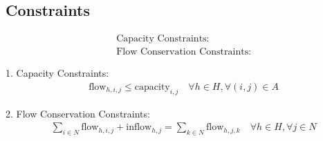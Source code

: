 \documentclass{article}
\begin{document}
	\subsection*{Constraints}
	\begin{align*}
		& \text{Capacity Constraints:} \\
		& \text{Flow Conservation Constraints:}
	\end{align*}
	
	1. Capacity Constraints:
	\begin{align*}
		& \text{flow}_{h,i,j} \leq \text{capacity}_{i,j} \quad \forall h \in H, \forall (i,j) \in A
	\end{align*}
	
	2. Flow Conservation Constraints:
	\begin{align*}
		& \sum_{i \in N} \text{flow}_{h,i,j} + \text{inflow}_{h,j} = \sum_{k \in N} \text{flow}_{h,j,k} \quad \forall h \in H, \forall j \in N
	\end{align*}
	
\end{document}

